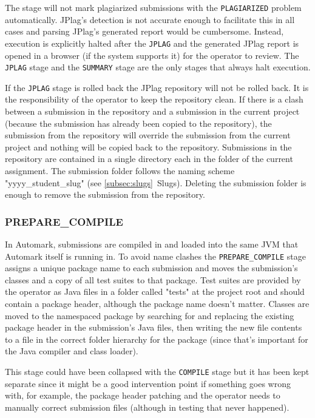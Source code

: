 \documentclass[12pt,a4paper,oneside]{report}
\begin{document}
	The stage will not mark plagiarized submissions with the \lstinline|PLAGIARIZED| problem automatically. JPlag's detection is not accurate enough to facilitate this in all cases and parsing JPlag's generated report would be cumbersome. Instead, execution is explicitly halted after the \lstinline|JPLAG| and the generated JPlag report is opened in a browser (if the system supports it) for the operator to review. The \lstinline|JPLAG| stage and the \lstinline|SUMMARY| stage are the only stages that always halt execution.

	If the \lstinline|JPLAG| stage is rolled back the JPlag repository will not be rolled back. It is the responsibility of the operator to keep the repository clean. If there is a clash between a submission in the repository and a submission in the current project (because the submission has already been copied to the repository), the submission from the repository will override the submission from the current project and nothing will be copied back to the repository. Submissions in the repository are contained in a single directory each in the folder of the current assignment. The submission folder follows the naming scheme "yyyy\_student\_slug" (see \ref{subsec:slugs}~Slugs). Deleting the submission folder is enough to remove the submission from the repository.

	\subsubsection{PREPARE\_COMPILE}
	In Automark, submissions are compiled in and loaded into the same JVM that Automark itself is running in. To avoid name clashes the \lstinline|PREPARE_COMPILE| stage assigns a unique package name to each submission and moves the submission's classes and a copy of all test suites to that package. Test suites are provided by the operator as Java files in a folder called "tests" at the project root and should contain a package header, although the package name doesn't matter. Classes are moved to the namespaced package by searching for and replacing the existing package header in the submission's Java files, then writing the new file contents to a file in the correct folder hierarchy for the package (since that's important for the Java compiler and class loader).

	This stage could have been collapsed with the \lstinline|COMPILE| stage but it has been kept separate since it might be a good intervention point if something goes wrong with, for example, the package header patching and the operator needs to manually correct submission files (although in testing that never happened).
\end{document}
